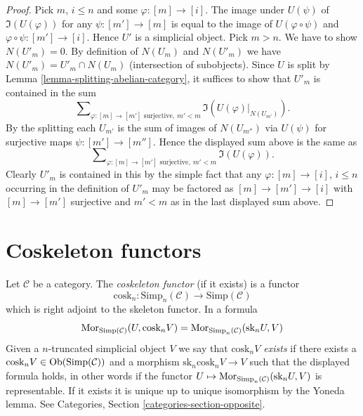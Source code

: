 \begin{proof}
Pick $m$, $i \leq n$ and some $\varphi : [m] \to [i]$.
The image under $U(\psi)$ of $\Im(U(\varphi))$
for any $\psi : [m'] \to [m]$ is
equal to the image of $U(\varphi \circ \psi)$ and
$\varphi \circ \psi : [m'] \to [i]$.
Hence $U'$ is a simplicial object.
Pick $m > n$. We have to show $N(U'_m) = 0$.
By definition of $N(U_m)$ and $N(U'_m)$ we have
$N(U'_m) = U'_m \cap N(U_m)$ (intersection of subobjects).
Since $U$ is split by Lemma \ref{lemma-splitting-abelian-category},
it suffices to show that $U'_m$ is contained in the sum
$$
\sum\nolimits_{\varphi : [m] \to [m']\text{ surjective}, \ m' < m}
\Im(U(\varphi)|_{N(U_{m'})}).
$$
By the splitting each $U_{m'}$ is the sum of images of
$N(U_{m''})$ via $U(\psi)$ for surjective maps
$\psi : [m'] \to [m'']$. Hence the displayed sum above
is the same as
$$
\sum\nolimits_{\varphi : [m] \to [m']\text{ surjective}, \ m' < m}
\Im(U(\varphi)).
$$
Clearly $U'_m$ is contained in this by the simple fact that
any $\varphi : [m] \to [i]$, $i \leq n$ occurring in the definition
of $U'_m$ may be factored as
$[m] \to [m'] \to [i]$ with $[m] \to [m']$ surjective
and $m' < m$ as in the last displayed sum above.
\end{proof}




\section{Coskeleton functors}
\label{section-coskeleton}

\noindent
Let $\mathcal{C}$ be a category.
The {\it coskeleton functor} (if it exists) is a functor
$$
\text{cosk}_n :
\text{Simp}_n(\mathcal{C}) \longrightarrow \text{Simp}(\mathcal{C})
$$
which is right adjoint to the skeleton functor. In a formula
\begin{equation}
\label{equation-cosk}
\mathop{\mathrm{Mor}}\nolimits_{\text{Simp}(\mathcal{C})}(U, \text{cosk}_n V)
=
\mathop{\mathrm{Mor}}\nolimits_{\text{Simp}_n(\mathcal{C})}(\text{sk}_n U, V)
\end{equation}
Given a $n$-truncated simplicial object $V$ we
say that {\it $\text{cosk}_nV$ exists} if there
exists a $\text{cosk}_nV \in \mathop{\mathrm{Ob}}\nolimits(\text{Simp}(\mathcal{C}))$
and a morphism $\text{sk}_n \text{cosk}_n V \to V$
such that the displayed formula holds, in other words
if the functor
$U \mapsto \mathop{\mathrm{Mor}}\nolimits_{\text{Simp}_n(\mathcal{C})}(\text{sk}_n U, V)$
is representable. If it exists it
is unique up to unique isomorphism by the Yoneda lemma.
See Categories, Section \ref{categories-section-opposite}.

